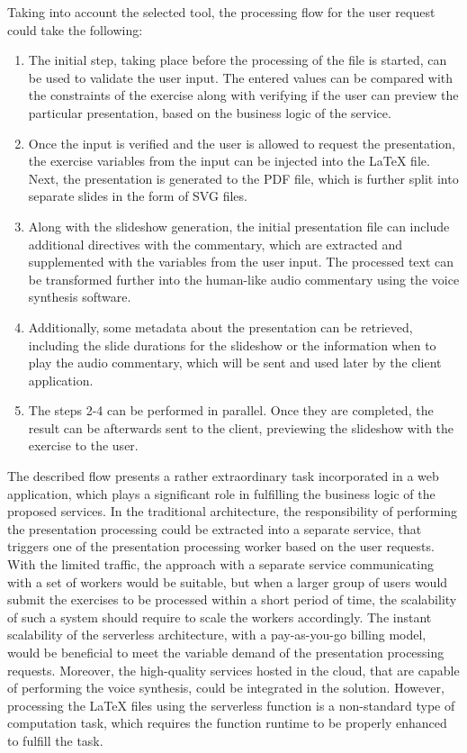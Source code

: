 Taking into account the selected tool, the processing flow for the user request could take the following:

\begin{enumerate}
   \item The initial step, taking place before the processing of the file is started, can be used to validate the user input. The entered values can be compared with the constraints of the exercise along with verifying if the user can preview the particular presentation, based on the business logic of the service.
   \item Once the input is verified and the user is allowed to request the presentation, the exercise variables from the input can be injected into the LaTeX file. 
   Next, the presentation is generated to the PDF file, which is further split into separate slides in the form of SVG files.
   \item Along with the slideshow generation, the initial presentation file can include additional directives with the commentary, which are extracted and supplemented with the variables from the user input. The processed text can be transformed further into the human-like audio commentary using the voice synthesis software.
   \item Additionally, some metadata about the presentation can be retrieved, including the slide durations for the slideshow or the information when to play the audio commentary, which will be sent and used later by the client application.
   \item The steps 2-4 can be performed in parallel. Once they are completed, the result can be afterwards sent to the client, previewing the slideshow with the exercise to the user.
\end{enumerate}

The described flow presents a rather extraordinary task incorporated in a web application, which plays a significant role in fulfilling the business logic of the proposed services.
In the traditional architecture, the responsibility of performing the presentation processing could be extracted into a separate service, that triggers one of the presentation processing worker based on the user requests.
With the limited traffic, the approach with a separate service communicating with a set of workers would be suitable, but when a larger group of users would submit the exercises to be processed within a short period of time, the scalability of such a system should require to scale the workers accordingly.
The instant scalability of the serverless architecture, with a pay-as-you-go billing model, would be beneficial to meet the variable demand of the presentation processing requests.
Moreover, the high-quality services hosted in the cloud, that are capable of performing the voice synthesis, could be integrated in the solution.
However, processing the LaTeX files using the serverless function is a non-standard type of computation task, which requires the function runtime to be properly enhanced to fulfill the task.

